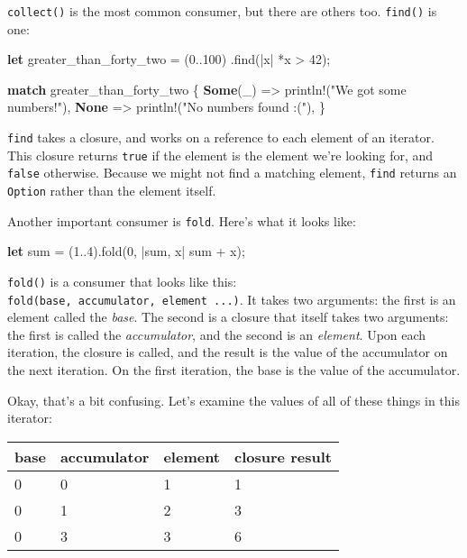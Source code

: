 \documentclass[a4paper,]{book}
\newenvironment{Shaded}{\begin{snugshade}}{\end{snugshade}}
\newcommand{\KeywordTok}[1]{\textcolor[rgb]{0.13,0.29,0.53}{\textbf{{#1}}}}
\newcommand{\DecValTok}[1]{\textcolor[rgb]{0.00,0.00,0.81}{{#1}}}
\newcommand{\StringTok}[1]{\textcolor[rgb]{0.31,0.60,0.02}{{#1}}}
\newcommand{\OtherTok}[1]{\textcolor[rgb]{0.56,0.35,0.01}{{#1}}}
\newcommand{\NormalTok}[1]{{#1}}
\begin{document}
\texttt{collect()} is the most common consumer, but there are others
too. \texttt{find()} is one:

\begin{Shaded}
\begin{Highlighting}[]
\KeywordTok{let} \NormalTok{greater_than_forty_two = (}\DecValTok{0.}\NormalTok{.}\DecValTok{100}\NormalTok{)}
                             \NormalTok{.find(|x| *x > }\DecValTok{42}\NormalTok{);}

\KeywordTok{match} \NormalTok{greater_than_forty_two \{}
    \KeywordTok{Some}\NormalTok{(_) => }\OtherTok{println!}\NormalTok{(}\StringTok{"We got some numbers!"}\NormalTok{),}
    \KeywordTok{None} \NormalTok{=> }\OtherTok{println!}\NormalTok{(}\StringTok{"No numbers found :("}\NormalTok{),}
\NormalTok{\}}
\end{Highlighting}
\end{Shaded}

\texttt{find} takes a closure, and works on a reference to each element
of an iterator. This closure returns \texttt{true} if the element is the
element we're looking for, and \texttt{false} otherwise. Because we
might not find a matching element, \texttt{find} returns an
\texttt{Option} rather than the element itself.

Another important consumer is \texttt{fold}. Here's what it looks like:

\begin{Shaded}
\begin{Highlighting}[]
\KeywordTok{let} \NormalTok{sum = (}\DecValTok{1.}\NormalTok{.}\DecValTok{4}\NormalTok{).fold(}\DecValTok{0}\NormalTok{, |sum, x| sum + x);}
\end{Highlighting}
\end{Shaded}

\texttt{fold()} is a consumer that looks like this:
\texttt{fold(base,\ \textbar{}accumulator,\ element\textbar{}\ ...)}. It
takes two arguments: the first is an element called the \emph{base}. The
second is a closure that itself takes two arguments: the first is called
the \emph{accumulator}, and the second is an \emph{element}. Upon each
iteration, the closure is called, and the result is the value of the
accumulator on the next iteration. On the first iteration, the base is
the value of the accumulator.

Okay, that's a bit confusing. Let's examine the values of all of these
things in this iterator:

\begin{longtable}[c]{@{}llll@{}}
\toprule
base & accumulator & element & closure result\tabularnewline
\midrule
\endhead
0 & 0 & 1 & 1\tabularnewline
0 & 1 & 2 & 3\tabularnewline
0 & 3 & 3 & 6\tabularnewline
\bottomrule
\end{longtable}
\end{document}
